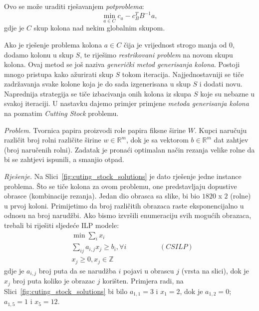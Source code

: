 \documentclass[a4paper, utf8, 11pt, colorlinks]{article}
\begin{document}
Ovo se može uraditi rješavanjem \emph{potproblema}:
$$\min_{a \in C} c_a - c_B^T B^{-1} a,$$
gdje je $C$ skup kolona nad nekim globalnim skupom. 

Ako je rješenje problema kolona $a \in C$ čija je vrijednost strogo manja od 0, dodamo kolonu u skup $S$, te riješimo \emph{restrikovani problem} na novom skupu kolona. Ovaj metod se još naziva \emph{generički metod generisanja kolona}.  
Postoji mnogo pristupa kako ažurirati skup $S$ tokom iteracija. 
Najjednostavniji se tiče zadržavanja svake kolone koja je do sada izgenerisana  u skup $S$ i dodati novu. Naprednija strategija se tiče izbacivanja onih kolona iz skupa $S$ koje su nebazne u svakoj iteraciji. 
 U nastavku dajemo primjer primjene \emph{metoda generisanja kolona} na poznatim \emph{Cutting Stock} problemu. 
 
 \emph{Problem}. Tvornica papira proizvodi role papira fiksne širine  $W$. 
 Kupci naručuju različit broj rolni različite širine $w \in \mathbb{R}^m$, dok je sa vektorom $b \in \mathbb{R}^m$ dat zahtjev (broj naručenih rolni).  Zadatak je pronaći optimalan način  rezanja velike rolne da bi se zahtjevi ispunili, a smanjio otpad.  
 
 \emph{Rješenje.} Na Slici~\ref{fig:cuting_stock_solutions} je dato rješenje jedne instance problema. 
 Što se tiče kolona za ovom problemu, one predstavljaju dopustive obrasce (kombinacije rezanja). Jedan dio obrasca sa slike, bi bio $1820$ x $2$ (rolne) u prvoj koloni.
 Primijetimo da broj različitih obrazaca raste eksponencijalno u odnosu na broj narudžbi.  Ako bismo izvršili enumeraciju svih mogućih obrazaca, trebali bi riješiti sljedeće ILP modele:
 \begin{align*}
      & \min \sum_{i} x_i \\
      & \sum_{ij} a_{i,j }x_j \geq b_i, \forall i \hspace{2cm} (CSILP)\\
      &  x_j \geq 0, x_{j} \in \mathbb{Z} 
 \end{align*}
 gdje je $a_{i,j}$ broj puta da se narudžba $i$ pojavi u obrascu $j$ (vrsta na slici), dok  je $x_j$ broj puta koliko je obrazac $j$ korišten. Primjera radi, na  Slici~\ref{fig:cuting_stock_solutions} bi bilo $a_{1,1}=3$ i $x_1 = 2$, dok je $a_{1,2}=0$; $a_{1,5}=1$ i $ x_5 = 12$.
 
\end{document}
